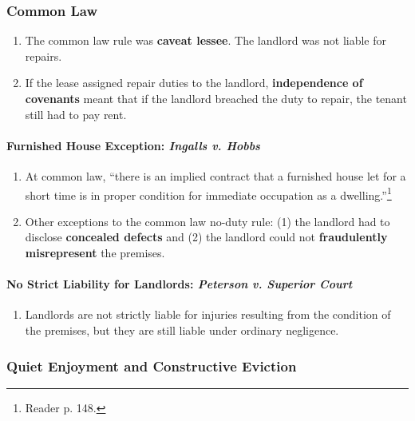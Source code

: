 \subsubsection{Common Law}

\begin{enumerate}
    \item The common law rule was \textbf{caveat lessee}. The landlord was not 
    liable for repairs.
    \item If the lease assigned repair duties to the landlord, 
    \textbf{independence of covenants} meant that if the landlord breached the 
    duty to repair, the tenant still had to pay rent.
\end{enumerate}

\paragraph{Furnished House Exception: \emph{Ingalls v. Hobbs}}

\begin{enumerate}
    \item At common law, ``there is an implied contract that a furnished house 
    let for a short time is in proper condition for immediate occupation as a 
    dwelling.''\footnote{Reader p. 148.}
    \item Other exceptions to the common law no-duty rule: (1) the landlord 
    had to disclose \textbf{concealed defects} and (2) the landlord could not 
    \textbf{fraudulently misrepresent} the premises.
\end{enumerate}

\paragraph{No Strict Liability for Landlords: \emph{Peterson v. Superior 
Court}}

\begin{enumerate}
    \item Landlords are not strictly liable for injuries resulting from the 
    condition of the premises, but they are still liable under ordinary 
    negligence.
\end{enumerate}

\subsubsection{Quiet Enjoyment and Constructive Eviction}


